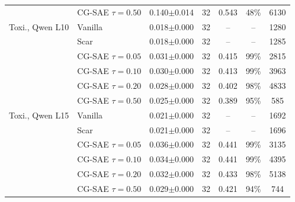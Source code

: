 \begin{tabular}{@{}ll ccccc@{}}
 & CG-SAE $\tau=0.50$ & 0.140$\pm$0.014 & 32 & 0.543 & 48\% & 6130 \\
\addlinespace[3pt]
Toxi., Qwen L10 & Vanilla & 0.018$\pm$0.000 & 32 & -- & -- & 1280 \\
 & Scar & 0.018$\pm$0.000 & 32 & -- & -- & 1285 \\
 & CG-SAE $\tau=0.05$ & 0.031$\pm$0.000 & 32 & 0.415 & 99\% & 2815 \\
 & CG-SAE $\tau=0.10$ & 0.030$\pm$0.000 & 32 & 0.413 & 99\% & 3963 \\
 & CG-SAE $\tau=0.20$ & 0.028$\pm$0.000 & 32 & 0.402 & 98\% & 4833 \\
 & CG-SAE $\tau=0.50$ & 0.025$\pm$0.000 & 32 & 0.389 & 95\% & 585 \\
\addlinespace[3pt]
Toxi., Qwen L15 & Vanilla & 0.021$\pm$0.000 & 32 & -- & -- & 1692 \\
 & Scar & 0.021$\pm$0.000 & 32 & -- & -- & 1696 \\
 & CG-SAE $\tau=0.05$ & 0.036$\pm$0.000 & 32 & 0.441 & 99\% & 3135 \\
 & CG-SAE $\tau=0.10$ & 0.034$\pm$0.000 & 32 & 0.441 & 99\% & 4395 \\
 & CG-SAE $\tau=0.20$ & 0.032$\pm$0.000 & 32 & 0.433 & 98\% & 5138 \\
 & CG-SAE $\tau=0.50$ & 0.029$\pm$0.000 & 32 & 0.421 & 94\% & 744 \\
\bottomrule
\end{tabular}